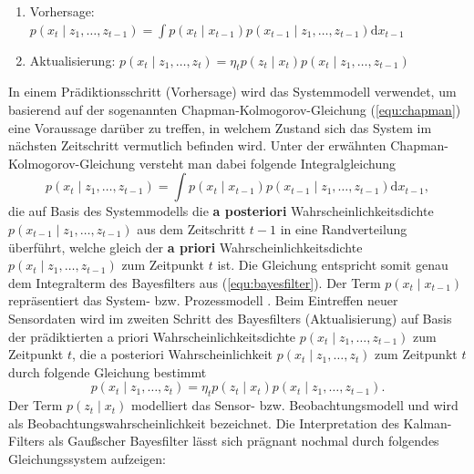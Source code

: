 \documentclass[12pt,a4paper,headsepline,bibliography=totoc,listof=totoc,headinclude=false,footinclude=false,BCOR5mm]{scrreprt} %
\begin{document}
\begin{enumerate}
\item Vorhersage: $p\left(x_{t}\mid z_{1}, \ldots, z_{t-1}\right)=\int p\left( x_{t} \mid  x_{t-1}\right)p\left(x_{t-1}\mid z_{1}, \ldots, z_{t-1}\right)\mathrm{d}x_{t-1}$
\item Aktualisierung: $p\left(x_{t}\mid z_{1}, \ldots, z_{t}\right)=\eta_{t} p\left(z_{t}\mid x_{t}\right)p\left(x_{t}\mid z_{1}, \ldots, z_{t-1}\right)$
\end{enumerate} In einem Pr{\"a}diktionsschritt (Vorhersage) wird das Systemmodell verwendet, um basierend auf der sogenannten Chapman-Kolmogorov-Gleichung (\ref{equ:chapman}) eine Voraussage dar{\"u}ber zu treffen, in welchem Zustand sich das System im n{\"a}chsten Zeitschritt vermutlich befinden wird. Unter der erw{\"a}hnten Chapman-Kolmogorov-Gleichung versteht man dabei folgende Integralgleichung
\begin{equation}\label{equ:chapman}
p\left(x_{t}\mid z_{1}, \ldots, z_{t-1}\right)=\int p\left(x_{t} \mid x_{t-1}\right)p\left(x_{t-1}\mid z_{1}, \ldots, z_{t-1}\right)\mathrm{d}x_{t-1},
\end{equation}
die auf Basis des Systemmodells die \textbf{a posteriori}  Wahrscheinlichkeitsdichte \\$p\left(x_{t-1}\mid z_{1}, \ldots, z_{t-1}\right)$ aus dem Zeitschritt $t-1$ in eine Randverteilung {\"u}berf{\"u}hrt, welche gleich der \textbf{a priori} Wahrscheinlichkeitsdichte $p\left(x_{t}\mid z_{1}, \ldots, z_{t-1}\right)$ zum Zeitpunkt $t$ ist. Die Gleichung entspricht somit genau dem Integralterm des Bayesfilters aus (\ref{equ:bayesfilter}).
 Der Term \begin{math}p\left(x_{t}\mid x_{t-1}\right)\end{math} repr{\"a}sentiert das System- bzw. Prozessmodell \cite[S. 35]{Schmitt2004VPS}. Beim Eintreffen neuer Sensordaten wird im zweiten Schritt des Bayesfilters (Aktualisierung) auf Basis der pr{\"a}diktierten a priori Wahrscheinlichkeitsdichte $p\left(x_{t}\mid z_{1}, \ldots, z_{t-1}\right)$ zum Zeitpunkt $t$,  die a posteriori Wahrscheinlichkeit $p\left(x_{t}\mid z_{1}, \ldots, z_{t}\right)$ zum Zeitpunkt $t$ durch folgende Gleichung bestimmt
\begin{equation}p\left(x_{t}\mid z_{1}, \ldots, z_{t}\right)=\eta_{t} p\left(z_{t}\mid x_{t}\right)p\left(x_{t}\mid z_{1}, \ldots, z_{t-1}\right). \end{equation} Der Term $p\left(z_{t}\mid x_{t}\right)$ modelliert das Sensor- bzw. Beobachtungsmodell und wird als Beobachtungswahrscheinlichkeit bezeichnet. Die Interpretation des Kalman-Filters als Gau{\ss}scher Bayesfilter l{\"a}sst sich pr{\"a}gnant nochmal durch folgendes Gleichungssystem aufzeigen:
\end{document}
